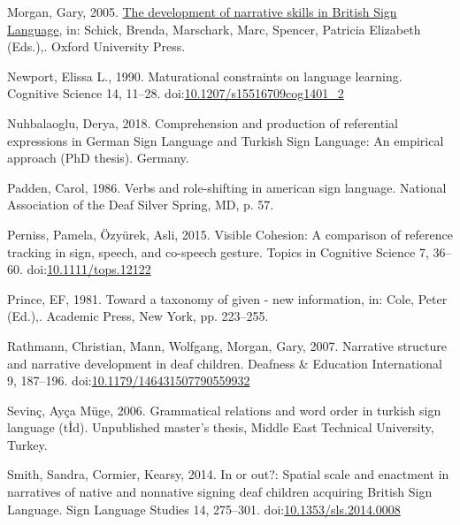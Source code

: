 \documentclass[]{elsarticle} %
\newlength{\cslhangindent}
\newenvironment{CSLReferences}[2] %
 {%
  \setlength{\parindent}{0pt}
  \ifodd #1 \everypar{\setlength{\hangindent}{\cslhangindent}}\ignorespaces\fi
  \ifnum #2 > 0
  \setlength{\parskip}{#2\baselineskip}
  \fi
 }%
 {}
\begin{document}
\begin{CSLReferences}{1}{0}
\leavevmode{}%
Morgan, Gary, 2005.
\href{http://www.oxfordscholarship.com/view/10.1093/acprof:oso/9780195180947.001.0001/acprof-9780195180947}{The
development of narrative skills in British Sign Language}, in: Schick,
Brenda, Marschark, Marc, Spencer, Patricia Elizabeth (Eds.),. Oxford
University Press.

\leavevmode{}%
Newport, Elissa L., 1990. Maturational constraints on language learning.
Cognitive Science 14, 11--28.
doi:\href{https://doi.org/10.1207/s15516709cog1401_2}{10.1207/s15516709cog1401\_2}

\leavevmode{}%
Nuhbalaoglu, Derya, 2018. Comprehension and production of referential
expressions in German Sign Language and Turkish Sign Language: An
empirical approach (PhD thesis). Germany.

\leavevmode{}%
Padden, Carol, 1986. Verbs and role-shifting in american sign language.
National Association of the Deaf Silver Spring, MD, p. 57.

\leavevmode{}%
Perniss, Pamela, Özyürek, Asli, 2015. Visible Cohesion: A comparison of
reference tracking in sign, speech, and co-speech gesture. Topics in
Cognitive Science 7, 36--60.
doi:\href{https://doi.org/10.1111/tops.12122}{10.1111/tops.12122}

\leavevmode{}%
Prince, EF, 1981. Toward a taxonomy of given - new information, in:
Cole, Peter (Ed.),. Academic Press, New York, pp. 223--255.

\leavevmode{}%
Rathmann, Christian, Mann, Wolfgang, Morgan, Gary, 2007. Narrative
structure and narrative development in deaf children. Deafness \&
Education International 9, 187--196.
doi:\href{https://doi.org/10.1179/146431507790559932}{10.1179/146431507790559932}

\leavevmode{}%
Sevinç, Ayça Müge, 2006. Grammatical relations and word order in turkish
sign language (t{İ}d). Unpublished master's thesis, Middle East
Technical University, Turkey.

\leavevmode{}%
Smith, Sandra, Cormier, Kearsy, 2014. In or out?: Spatial scale and
enactment in narratives of native and nonnative signing deaf children
acquiring British Sign Language. Sign Language Studies 14, 275--301.
doi:\href{https://doi.org/10.1353/sls.2014.0008}{10.1353/sls.2014.0008}


\end{CSLReferences}
\end{document}
